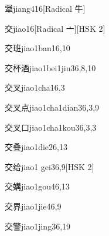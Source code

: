 \begin{entry}{犟}{jiang4}{16}[Radical 牛]
\end{entry}

\begin{entry}{交}{jiao1}{6}[Radical 亠][HSK 2]
\end{entry}

\begin{entry}{交班}{jiao1ban1}{6,10}
\end{entry}

\begin{entry}{交杯酒}{jiao1bei1jiu3}{6,8,10}
\end{entry}

\begin{entry}{交叉}{jiao1cha1}{6,3}
\end{entry}

\begin{entry}{交叉点}{jiao1cha1dian3}{6,3,9}
\end{entry}

\begin{entry}{交叉口}{jiao1cha1kou3}{6,3,3}
\end{entry}

\begin{entry}{交叠}{jiao1die2}{6,13}
\end{entry}

\begin{entry}{交给}{jiao1 gei3}{6,9}[HSK 2]
\end{entry}

\begin{entry}{交媾}{jiao1gou4}{6,13}
\end{entry}

\begin{entry}{交界}{jiao1jie4}{6,9}
\end{entry}

\begin{entry}{交警}{jiao1jing3}{6,19}
\end{entry}

